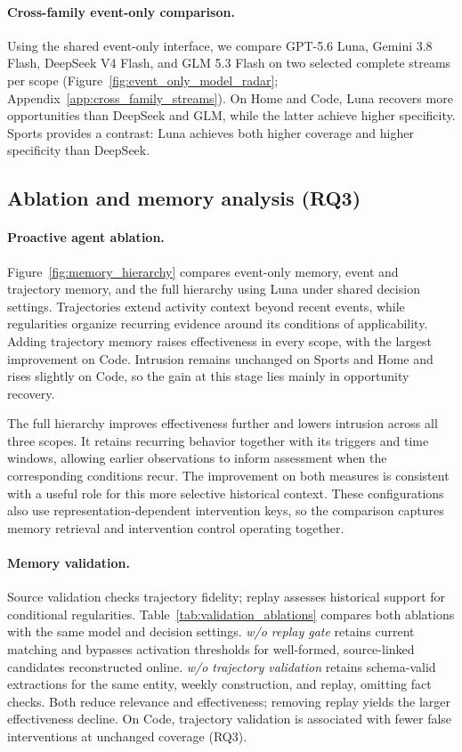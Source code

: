 \paragraph{Cross-family event-only comparison.}
Using the shared event-only interface, we compare GPT-5.6 Luna, Gemini 3.8 Flash, DeepSeek V4 Flash, and GLM 5.3 Flash on two selected complete streams per scope (Figure~\ref{fig:event_only_model_radar}; Appendix~\ref{app:cross_family_streams}).
On Home and Code, Luna recovers more opportunities than DeepSeek and GLM, while the latter achieve higher specificity.
Sports provides a contrast: Luna achieves both higher coverage and higher specificity than DeepSeek.

\subsection{Ablation and memory analysis (RQ3)}
\label{sec:hierarchy}
\label{sec:validation_ablations}

\paragraph{Proactive agent ablation.}
Figure~\ref{fig:memory_hierarchy} compares event-only memory, event and trajectory memory, and the full hierarchy using Luna under shared decision settings.
Trajectories extend activity context beyond recent events, while regularities organize recurring evidence around its conditions of applicability.
Adding trajectory memory raises effectiveness in every scope, with the largest improvement on Code.
Intrusion remains unchanged on Sports and Home and rises slightly on Code, so the gain at this stage lies mainly in opportunity recovery.

The full hierarchy improves effectiveness further and lowers intrusion across all three scopes.
It retains recurring behavior together with its triggers and time windows, allowing earlier observations to inform assessment when the corresponding conditions recur.
The improvement on both measures is consistent with a useful role for this more selective historical context.
These configurations also use representation-dependent intervention keys, so the comparison captures memory retrieval and intervention control operating together.

\paragraph{Memory validation.}
Source validation checks trajectory fidelity; replay assesses historical support for conditional regularities.
Table~\ref{tab:validation_ablations} compares both ablations with the same model and decision settings.
\emph{w/o replay gate} retains current matching and bypasses activation thresholds for well-formed, source-linked candidates reconstructed online.
\emph{w/o trajectory validation} retains schema-valid extractions for the same entity, weekly construction, and replay, omitting fact checks.
Both reduce relevance and effectiveness; removing replay yields the larger effectiveness decline.
On Code, trajectory validation is associated with fewer false interventions at unchanged coverage (RQ3).

